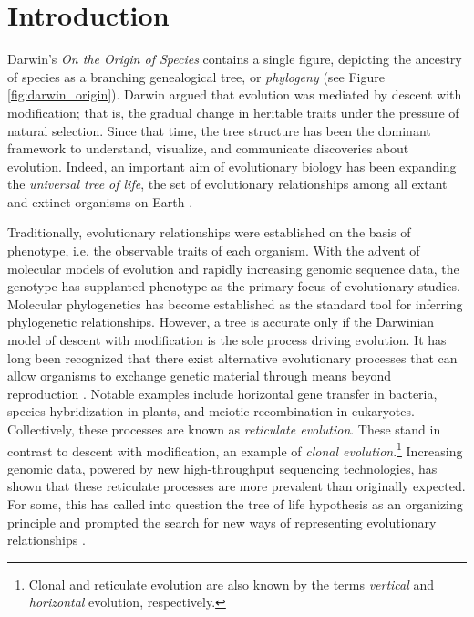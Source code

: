 \chapter{Introduction}
\label{ch:introduction}


Darwin's \emph{On the Origin of Species} contains a single figure, depicting the ancestry of species as a branching genealogical tree, or \emph{phylogeny} \cite{Darwin:1859uh} (see Figure \ref{fig:darwin_origin}).
Darwin argued that evolution was mediated by descent with modification; that is, the gradual change in heritable traits under the pressure of natural selection.
Since that time, the tree structure has been the dominant framework to understand, visualize, and communicate discoveries about evolution.
Indeed, an important aim of evolutionary biology has been expanding the \emph{universal tree of life}, the set of evolutionary relationships among all extant and extinct organisms on Earth \cite{Bowler:2003uz}.

Traditionally, evolutionary relationships were established on the basis of phenotype, i.e. the observable traits of each organism.
With the advent of molecular models of evolution and rapidly increasing genomic sequence data, the genotype has supplanted phenotype as the primary focus of evolutionary studies.
Molecular phylogenetics has become established as the standard tool for inferring phylogenetic relationships.
However, a tree is accurate only if the Darwinian model of descent with modification is the sole process driving evolution.
It has long been recognized that there exist alternative evolutionary processes that can allow organisms to exchange genetic material through means beyond reproduction \cite{Arnold:2007vq}.
Notable examples include horizontal gene transfer in bacteria, species hybridization in plants, and meiotic recombination in eukaryotes.
Collectively, these processes are known as \emph{reticulate evolution}.
These stand in contrast to descent with modification, an example of \emph{clonal evolution}.\footnote{Clonal and reticulate evolution are also known by the terms \emph{vertical} and \emph{horizontal} evolution, respectively.}
Increasing genomic data, powered by new high-throughput sequencing technologies, has shown that these reticulate processes are more prevalent than originally expected.
For some, this has called into question the tree of life hypothesis as an organizing principle and prompted the search for new ways of representing evolutionary relationships \cite{Doolittle:1999,OMalley:2011tu}.

